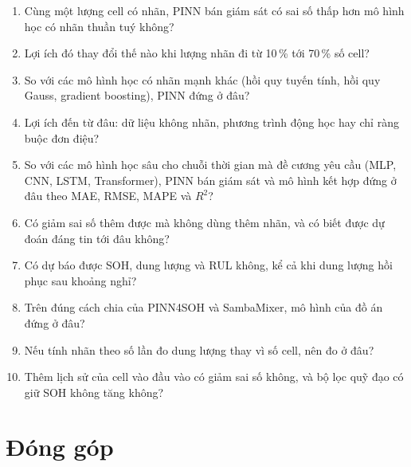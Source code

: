 \documentclass[12pt,a4paper,oneside]{report}
\theoremstyle{plain}
\theoremstyle{definition}
\begin{document}
\begin{enumerate}[label=\textbf{CH\arabic*.}]
\item Cùng một lượng cell có nhãn, PINN bán giám sát có sai số thấp hơn mô hình học có nhãn thuần tuý không?
\item Lợi ích đó thay đổi thế nào khi lượng nhãn đi từ 10\,\% tới 70\,\% số cell?
\item So với các mô hình học có nhãn mạnh khác (hồi quy tuyến tính, hồi quy Gauss, gradient boosting), PINN đứng ở
      đâu?
\item Lợi ích đến từ đâu: dữ liệu không nhãn, phương trình động học hay chỉ ràng buộc đơn điệu?
\item So với các mô hình học sâu cho chuỗi thời gian mà đề cương yêu cầu (MLP, CNN, LSTM, Transformer), PINN bán
      giám sát và mô hình kết hợp đứng ở đâu theo MAE, RMSE, MAPE và $R^2$?
\item Có giảm sai số thêm được mà không dùng thêm nhãn, và có biết được dự đoán đáng tin tới đâu không?
\item Có dự báo được SOH, dung lượng và RUL không, kể cả khi dung lượng hồi phục sau khoảng nghỉ?
\item Trên đúng cách chia của PINN4SOH và SambaMixer, mô hình của đồ án đứng ở đâu?
\item Nếu tính nhãn theo số lần đo dung lượng thay vì số cell, nên đo ở đâu?
\item Thêm lịch sử của cell vào đầu vào có giảm sai số không, và bộ lọc quỹ đạo có giữ SOH không tăng không?
\end{enumerate}


\section{Đóng góp}
\end{document}
